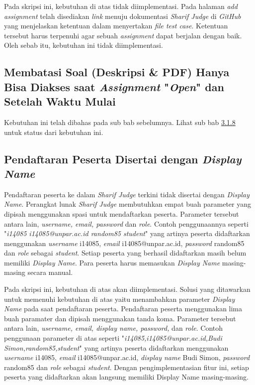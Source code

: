 Pada skripsi ini, kebutuhan di atas tidak diimplementasi. Pada halaman \textit{add assignment} telah disediakan \textit{link} menuju dokumentasi \textit{Sharif Judge} di \textit{GitHub} yang menjelaskan ketentuan dalam menyertakan \textit{file test case}. Ketentuan tersebut harus terpenuhi agar sebuah \textit{assignment} dapat berjalan dengan baik. Oleh sebab itu, kebutuhan ini tidak diimplementasi.

\subsection{Membatasi Soal (Deskripsi \& PDF) Hanya Bisa Diakses saat \textit{Assignment} "\textit{Open}" dan Setelah Waktu Mulai}
Kebutuhan ini telah dibahas pada sub bab sebelumnya. Lihat sub bab \hyperref[subsec:membatasisoal]{3.1.8} untuk status dari kebutuhan ini.

\subsection{Pendaftaran Peserta Disertai dengan \textit{Display Name}}
Pendaftaran peserta ke dalam \textit{Sharif Judge} terkini tidak disertai dengan \textit{Display Name}. Perangkat lunak \textit{Sharif Judge} membutuhkan empat buah parameter yang dipisah menggunakan spasi untuk mendaftarkan peserta. Parameter tersebut antara lain, \textit{username, \textit{email}, password} dan \textit{role}. Contoh penggunaannya seperti "\textit{i14085 i14085@unpar.ac.id random85 student}" yang artinya peserta didaftarkan menggunakan \textit{username} i14085, \textit{email} i14085@unpar.ac.id, \textit{password} random85 dan \textit{role} sebagai \textit{student}. Setiap peserta yang berhasil didaftarkan masih belum memiliki \textit{Display Name}. Para peserta harus memasukan \textit{Display Name} masing-masing secara manual. 

Pada skripsi ini, kebutuhan di atas akan diimplementasi. Solusi yang ditawarkan untuk memenuhi kebutuhan di atas yaitu menambahkan parameter \textit{Display Name} pada saat pendaftaran peserta. Pendaftaran peserta menggunakan lima buah paramater dan dipisah menggunakan tanda koma. Parameter tersebut antara lain,\textit{ username, email, display name, password,} dan \textit{role}. Contoh penggunaan parameter di atas seperti "\textit{i14085,i14085@unpar.ac.id,Budi Simon,random85,student}" yang artinya peserta didaftarkan menggunakan \textit{username} i14085, \textit{email} i14085@unpar.ac.id, \textit{display name} Budi Simon, \textit{password} random85 dan \textit{role} sebagai \textit{student}. Dengan pengimplementasian fitur ini, setiap peserta yang didaftarkan akan langsung memiliki Display Name masing-masing.


